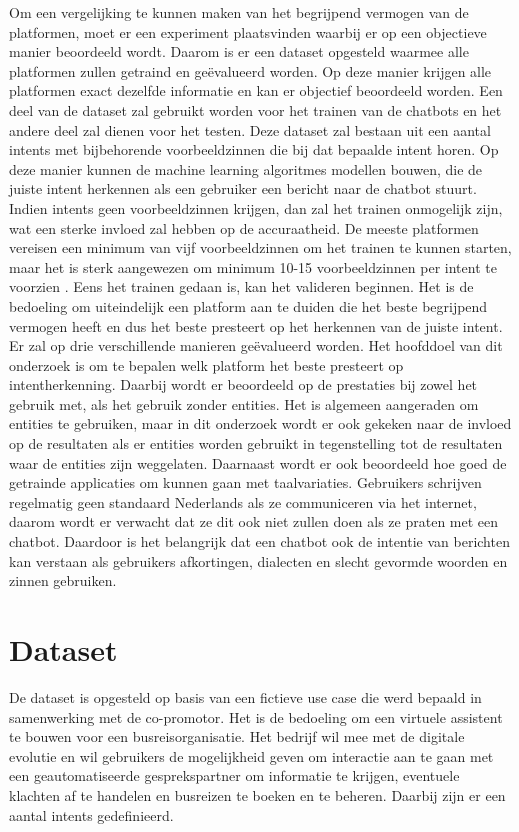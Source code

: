 Om een vergelijking te kunnen maken van het begrijpend vermogen van de platformen, moet er een experiment plaatsvinden waarbij er op een objectieve manier beoordeeld wordt. Daarom is er een dataset opgesteld waarmee alle platformen zullen getraind en geëvalueerd worden. Op deze manier krijgen alle platformen exact dezelfde informatie en kan er objectief beoordeeld worden. Een deel van de dataset zal gebruikt worden voor het trainen van de chatbots en het andere deel zal dienen voor het testen. Deze dataset zal bestaan uit een aantal intents met bijbehorende voorbeeldzinnen die bij dat bepaalde intent horen. Op deze manier kunnen de machine learning algoritmes modellen bouwen, die de juiste intent herkennen als een gebruiker een bericht naar de chatbot stuurt. Indien intents geen voorbeeldzinnen krijgen, dan zal het trainen onmogelijk zijn, wat een sterke invloed zal hebben op de accuraatheid. De meeste platformen vereisen een minimum van vijf voorbeeldzinnen om het trainen te kunnen starten, maar het is sterk aangewezen om minimum 10-15 voorbeeldzinnen per intent te voorzien \autocite{Greyling2019}. Eens het trainen gedaan is, kan het valideren beginnen. Het is de bedoeling om uiteindelijk een platform aan te duiden die het beste begrijpend vermogen heeft en dus het beste presteert op het herkennen van de juiste intent. Er zal op drie verschillende manieren geëvalueerd worden. Het hoofddoel van dit onderzoek is om te bepalen welk platform het beste presteert op intentherkenning. Daarbij wordt er beoordeeld op de prestaties bij zowel het gebruik met, als het gebruik zonder entities. Het is algemeen aangeraden om entities te gebruiken, maar in dit onderzoek wordt er ook gekeken naar de invloed op de resultaten als er entities worden gebruikt in tegenstelling tot de resultaten waar de entities zijn weggelaten. Daarnaast wordt er ook beoordeeld hoe goed de getrainde applicaties om kunnen gaan met taalvariaties. Gebruikers schrijven regelmatig geen standaard Nederlands als ze communiceren via het internet, daarom wordt er verwacht dat ze dit ook niet zullen doen als ze praten met een chatbot. Daardoor is het belangrijk dat een chatbot ook de intentie van berichten kan verstaan als gebruikers afkortingen, dialecten en slecht gevormde woorden en zinnen gebruiken.

\section{Dataset}
\label{sec:dataset}

De dataset is opgesteld op basis van een fictieve use case die werd bepaald in samenwerking met de co-promotor. Het is de bedoeling om een virtuele assistent te bouwen voor een busreisorganisatie. Het bedrijf wil mee met de digitale evolutie en wil gebruikers de mogelijkheid geven om interactie aan te gaan met een geautomatiseerde gesprekspartner om informatie te krijgen, eventuele klachten af te handelen en busreizen te boeken en te beheren. Daarbij zijn er een aantal intents gedefinieerd.

